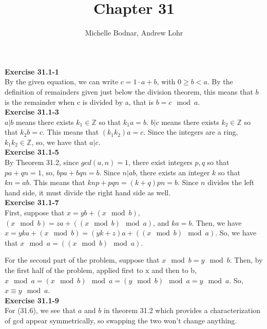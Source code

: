\documentclass{article}
\title{Chapter 31}
\author{Michelle Bodnar, Andrew Lohr}
\newcommand{\Z}{\mathbb{Z}}
\begin{document}
\maketitle
\noindent\textbf{Exercise 31.1-1}\\

By the given equation, we can write $c = 1\cdot a + b$, with $0\ge b <a$. By the definition of remainders given just below the division theorem, this means that $b$ is the remainder when c is divided by a, that is $b=  c\mod a$.\\



\noindent\textbf{Exercise 31.1-3}\\

$a | b$ means there exists $k_1\in \Z$ so that $k_1 a = b$. $b|c$ means there exists $k_2\in \Z$ so that $k_2 b = c$. This means that $(k_1 k_2) a = c$. Since the integers are a ring, $k_1 k_2 \in \Z$, so, we have that $a | c$.\\



\noindent\textbf{Exercise 31.1-5}\\

By Theorem 31.2, since $gcd(a,n) =1$, there exist integers $p,q$ so that $pa +qn = 1$, so, $bpa+bqn=b$. Since $n | ab$, there exists an integer $k$ so that $kn = ab$. This means that $knp + pqn =(k +q)pn= b$. Since $n$ divides the left hand side, it must divide the right hand side as well.\\



\noindent\textbf{Exercise 31.1-7}\\

First, suppose that $x = yb + (x\mod b)$, $(x\mod b) = za + ((x\mod b)\mod a)$, and $ka =b$. Then, we have $x = yka +(x\mod b) = (yk+ z) a + ((x\mod b)\mod a)$. So, we have that $x\mod a =  ((x\mod b)\mod a)$.

For the second part of the problem, suppose that $ x\mod b = y\mod b$. Then, by the first half of the problem, applied first to x and then to b, $x \mod a = (x\mod b) \mod a = (y\mod b)\mod a = y\mod a$. So, $x \equiv y \mod a$.\\



\noindent\textbf{Exercise 31.1-9}\\

For (31.6), we see that $a$ and $b$ in theorem 31.2 which provides a characterization of gcd appear symmetrically, so swapping the two won't change anything.
\end{document}
